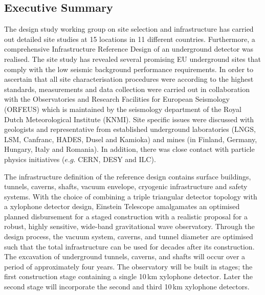 \subsection{Executive Summary}
The design study working group on site selection and infrastructure has carried out detailed site studies at 15 locations in 11 different countries. Furthermore, a comprehensive Infrastructure Reference Design of an underground detector was realised. The site study has revealed several promising EU underground sites that comply with the low seismic background performance requirements. In order to ascertain that all site characterisation procedures were according to the highest standards, measurements and data collection were carried out in collaboration with the Observatories and Research Facilities for European Seismology (ORFEUS) which is maintained by the seismology department of the Royal Dutch Meteorological Institute (KNMI). Site specific issues were discussed with geologists and representative from established underground laboratories (LNGS, LSM, Canfranc, HADES, Dusel and Kamioka) and mines (in Finland, Germany, Hungary, Italy and Romania). In addition, there was close contact with particle physics initiatives ($e.g.$ CERN, DESY and ILC).

The infrastructure definition of the reference design contains surface buildings, tunnels, caverns, shafts, vacuum envelope,  cryogenic infrastructure and safety systems.  With the choice of combining a triple triangular detector topology with a xylophone detector design, Einstein Telescope amalgamates an optimised planned disbursement for a staged construction with a realistic proposal for a robust, highly sensitive, wide-band gravitational wave observatory. Through the design process, the vacuum system, caverns, and tunnel diameter are optimised such that the total infrastructure can be used for decades after its construction. The excavation of underground tunnels, caverns, and shafts will occur over a period of approximately four years. The observatory will be built in stages; the first construction stage containing a single 10\,km xylophone detector. Later the second stage will incorporate the second and third 10\,km xylophone detectors.



